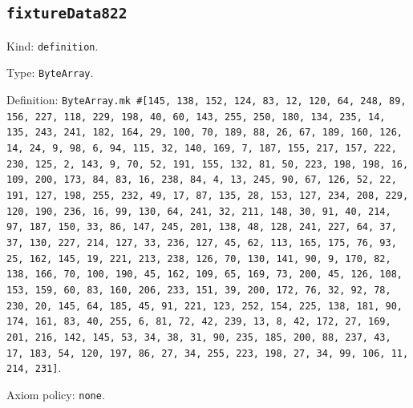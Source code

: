 \documentclass[11pt]{article}
\begin{document}
\subsection*{\texttt{fixtureData822}}
\noindent Kind: \texttt{definition}.\par
\noindent Type: \texttt{ByteArray}.\par
\noindent Definition: \texttt{ByteArray.mk \#[145, 138, 152, 124, 83, 12, 120, 64, 248, 89, 156, 227, 118, 229, 198, 40, 60, 143, 255, 250, 180, 134, 235, 14, 135, 243, 241, 182, 164, 29, 100, 70, 189, 88, 26, 67, 189, 160, 126, 14, 24, 9, 98, 6, 94, 115, 32, 140, 169, 7, 187, 155, 217, 157, 222, 230, 125, 2, 143, 9, 70, 52, 191, 155, 132, 81, 50, 223, 198, 198, 16, 109, 200, 173, 84, 83, 16, 238, 84, 4, 13, 245, 90, 67, 126, 52, 22, 191, 127, 198, 255, 232, 49, 17, 87, 135, 28, 153, 127, 234, 208, 229, 120, 190, 236, 16, 99, 130, 64, 241, 32, 211, 148, 30, 91, 40, 214, 97, 187, 150, 33, 86, 147, 245, 201, 138, 48, 128, 241, 227, 64, 37, 37, 130, 227, 214, 127, 33, 236, 127, 45, 62, 113, 165, 175, 76, 93, 25, 162, 145, 19, 221, 213, 238, 126, 70, 130, 141, 90, 9, 170, 82, 138, 166, 70, 100, 190, 45, 162, 109, 65, 169, 73, 200, 45, 126, 108, 153, 159, 60, 83, 160, 206, 233, 151, 39, 200, 172, 76, 32, 92, 78, 230, 20, 145, 64, 185, 45, 91, 221, 123, 252, 154, 225, 138, 181, 90, 174, 161, 83, 40, 255, 6, 81, 72, 42, 239, 13, 8, 42, 172, 27, 169, 201, 216, 142, 145, 53, 34, 38, 31, 90, 235, 185, 200, 88, 237, 43, 17, 183, 54, 120, 197, 86, 27, 34, 255, 223, 198, 27, 34, 99, 106, 11, 214, 231]}.\par
\noindent Axiom policy: \texttt{none}.\par
\end{document}
